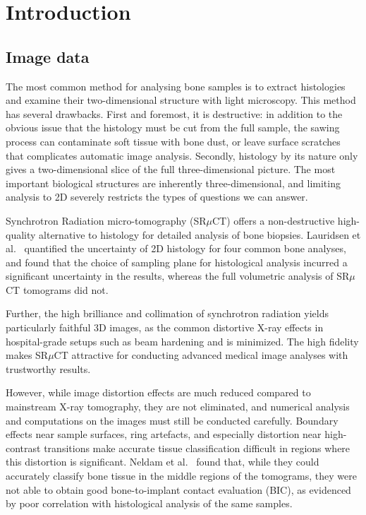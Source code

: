 
\section{Introduction}
\label{sec:intro}


\subsection{Image data}

The most common method for analysing bone samples is to extract histologies and examine their two-dimensional structure with light microscopy.
This method has several drawbacks. First and foremost, it is destructive: in addition to the obvious issue that the histology must be cut
from the full sample, the sawing process can contaminate soft tissue with bone dust, or leave surface scratches that complicates automatic image analysis.
Secondly, histology by its nature only gives a two-dimensional slice of the full three-dimensional picture. The most important biological structures
are inherently three-dimensional, and limiting analysis to 2D severely restricts the types of questions we can answer. 

Synchrotron Radiation micro-tomography (SR$\mu$CT) offers a non-destructive high-quality alternative to histology for detailed analysis of bone biopsies.
Lauridsen et al.~\cite{torsten2018} quantified the uncertainty of 2D histology for four common bone analyses, and found that the choice of sampling
plane for histological analysis incurred a significant uncertainty in the results, whereas the full volumetric analysis of SR$\mu$CT tomograms did not.

Further, the high brilliance and collimation of synchrotron radiation yields particularly faithful 3D images, as the common distortive X-ray effects
in hospital-grade setups such as beam hardening and  is minimized. The high fidelity
makes SR$\mu$CT attractive for conducting advanced medical image analyses with trustworthy results.

However, while image distortion effects are much reduced compared to mainstream X-ray tomography, they are not eliminated, and numerical
analysis and computations on the images must still be conducted carefully. Boundary
effects near sample surfaces, ring artefacts, and especially distortion near high-contrast transitions make accurate tissue classification
difficult in regions where this distortion is significant. Neldam et al.~\cite{sporring} found that, while they could accurately classify
bone tissue in the middle regions of the tomograms, they were not able to obtain good bone-to-implant contact evaluation (BIC), as evidenced
by poor correlation with histological analysis of the same samples.

